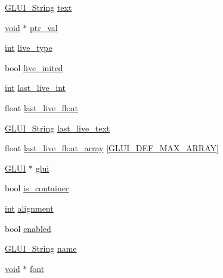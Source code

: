 \begin{DoxyCompactItemize}
\hyperlink{glui_8h_aada824856f7bcf29794719981ebd8f60}{G\+L\+U\+I\+\_\+\+String} \hyperlink{class_g_l_u_i___control_af0d60e9736f4dbc34e9a536e75876d72}{text}
\item 
\hyperlink{wglext_8h_a9e6b7f1933461ef318bb000d6bd13b83}{void} $\ast$ \hyperlink{class_g_l_u_i___control_a0890ea809b8d980695939e1d92a0af47}{ptr\+\_\+val}
\item 
\hyperlink{wglext_8h_a500a82aecba06f4550f6849b8099ca21}{int} \hyperlink{class_g_l_u_i___control_a8ba7cae809a47dd870592aa2cc85483b}{live\+\_\+type}
\item 
bool \hyperlink{class_g_l_u_i___control_a74977797cf84a38ef78de8c548bc2d25}{live\+\_\+inited}
\item 
\hyperlink{wglext_8h_a500a82aecba06f4550f6849b8099ca21}{int} \hyperlink{class_g_l_u_i___control_abef31d8d51c8088afd6ac96ec7b596bf}{last\+\_\+live\+\_\+int}
\item 
float \hyperlink{class_g_l_u_i___control_aa9ebadbed670a1fa061918705083db57}{last\+\_\+live\+\_\+float}
\item 
\hyperlink{glui_8h_aada824856f7bcf29794719981ebd8f60}{G\+L\+U\+I\+\_\+\+String} \hyperlink{class_g_l_u_i___control_ac77569805eb6ccfce3f4ff1d09c309b6}{last\+\_\+live\+\_\+text}
\item 
float \hyperlink{class_g_l_u_i___control_a719177af6b52ae3373d2b3c30430ff58}{last\+\_\+live\+\_\+float\+\_\+array} \mbox{[}\hyperlink{glui_8h_ae6cbace033fae45e6088bf23b1f72f4a}{G\+L\+U\+I\+\_\+\+D\+E\+F\+\_\+\+M\+A\+X\+\_\+\+A\+R\+R\+A\+Y}\mbox{]}
\item 
\hyperlink{class_g_l_u_i}{G\+L\+U\+I} $\ast$ \hyperlink{class_g_l_u_i___control_ac731aebe26d7eb0b916a9692229f0eb6}{glui}
\item 
bool \hyperlink{class_g_l_u_i___control_ac667bec4efbc9bdbf3e246b4471fb4cb}{is\+\_\+container}
\item 
\hyperlink{wglext_8h_a500a82aecba06f4550f6849b8099ca21}{int} \hyperlink{class_g_l_u_i___control_a5d352c36d6bad2a1eaf9795bba00b7e7}{alignment}
\item 
bool \hyperlink{class_g_l_u_i___control_a834202682d00a31a2141eae6709d37e1}{enabled}
\item 
\hyperlink{glui_8h_aada824856f7bcf29794719981ebd8f60}{G\+L\+U\+I\+\_\+\+String} \hyperlink{class_g_l_u_i___control_aa95b97d50df45335fc33f0af03958eb3}{name}
\item 
\hyperlink{wglext_8h_a9e6b7f1933461ef318bb000d6bd13b83}{void} $\ast$ \hyperlink{class_g_l_u_i___control_a132273406b5ea6d95cd26501fc2f2027}{font}
\item 

\end{DoxyCompactItemize}
